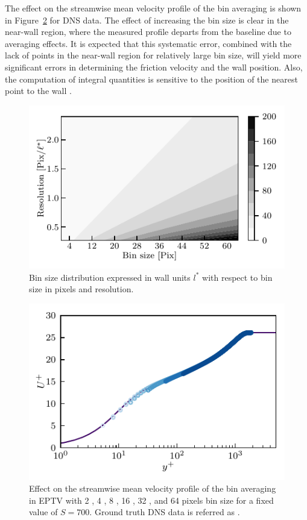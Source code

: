 The effect on the streamwise mean velocity profile of the bin averaging is shown in Figure~\ref{fig:F1_DNSprofiles} for DNS data. The effect of increasing the bin size is clear in the near-wall region, where the measured profile departs from the baseline due to averaging effects. It is expected that this systematic error, combined with the lack of points in the near-wall region for relatively large bin size, will yield more significant errors in determining the friction velocity and the wall position. Also, the computation of integral quantities is sensitive to the position of the nearest point to the wall \citep{titchener2015calculation,Rodriguez-Lopez2015}. 

\begin{figure}
    \centering
    \includegraphics[width=0.75\columnwidth]{Figures/figure08.pdf}
    \caption{Bin size distribution {expressed in wall units $l^*$} with respect to bin size in pixels and resolution.}
    \label{fig:window}
\end{figure}


\begin{figure}
    \centering
    \includegraphics[width=0.75\columnwidth]{Figures/figure05.pdf}
    \caption{Effect on the streamwise mean velocity profile of the bin averaging in EPTV with 2 , 4 , 8 , 16 , {32} , and 64  pixels bin size for a fixed value of $S=700$. Ground truth DNS data is referred as .}
    \label{fig:F1_DNSprofiles}
\end{figure}

